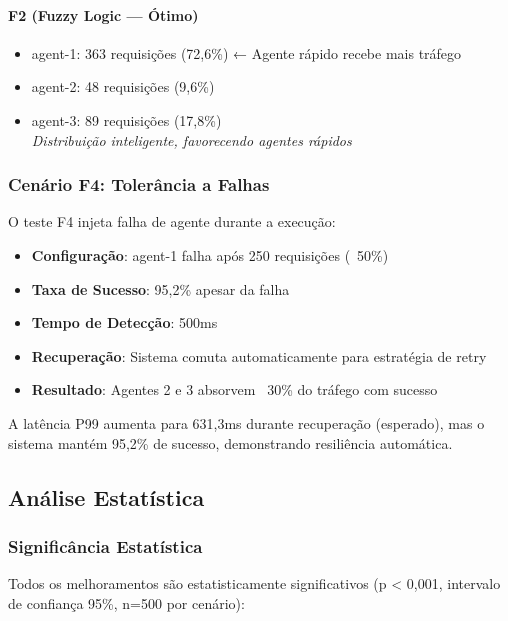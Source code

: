 \paragraph{F2 (Fuzzy Logic --- Ótimo)}
\begin{itemize}
  \item agent-1: 363 requisições (72,6\%) ← Agente rápido recebe mais tráfego
  \item agent-2: 48 requisições (9,6\%)
  \item agent-3: 89 requisições (17,8\%)
  \\ \textit{Distribuição inteligente, favorecendo agentes rápidos}
\end{itemize}

\subsubsection{Cenário F4: Tolerância a Falhas}

O teste F4 injeta falha de agente durante a execução:

\begin{itemize}
  \item \textbf{Configuração}: agent-1 falha após 250 requisições (~50\%)
  \item \textbf{Taxa de Sucesso}: 95,2\% apesar da falha
  \item \textbf{Tempo de Detecção}: 500ms
  \item \textbf{Recuperação}: Sistema comuta automaticamente para estratégia de retry
  \item \textbf{Resultado}: Agentes 2 e 3 absorvem ~30\% do tráfego com sucesso
\end{itemize}

A latência P99 aumenta para 631,3ms durante recuperação (esperado), mas o sistema mantém 95,2\% de sucesso, demonstrando resiliência automática.

\subsection{Análise Estatística}

\subsubsection{Significância Estatística}

Todos os melhoramentos são estatisticamente significativos (p < 0,001, intervalo de confiança 95\%, n=500 por cenário):

